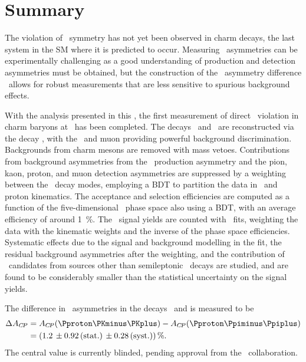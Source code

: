 \chapter{Summary}
\label{chap:cpv:summary}

The violation of \CP\ symmetry has not yet been observed in charm decays, the 
last system in the \ac{SM} where it is predicted to occur.
Measuring \CP\ asymmetries can be experimentally challenging as a good 
understanding of production and detection asymmetries must be obtained, but the 
construction of the \CP\ asymmetry difference \dACP\ allows for robust 
measurements that are less sensitive to spurious background effects.

With the analysis presented in this , the first 
measurement of direct \CP\ violation in charm baryons at \lhcb\ has been 
completed.
The decays \LcTopKK\ and \LcToppipi\ are reconstructed via the decay 
\LbToLcmuX, with the \PLambdab\ and muon providing powerful background 
discrimination.
Backgrounds from charm mesons are removed with mass vetoes.
Contributions from background asymmetries from the \PLambdab\ production 
asymmetry and the pion, kaon, proton, and muon detection asymmetries are 
suppressed by a weighting between the \PLambdac\ decay modes, employing a 
\acl{BDT} to partition the data in \PLambdac\ and proton kinematics.
The acceptance and selection efficiencies are computed as a function of the 
five-dimensional \PLambdac\ phase space also using a \ac{BDT}, with an average 
efficiency of around \SI{1}{\percent}.
The \PLambdac\ signal yields are counted with \chisq\ fits, weighting the data 
with the kinematic weights and the inverse of the phase space efficiencies.
Systematic effects due to the signal and background modelling in the fit, the 
residual background asymmetries after the weighting, and the contribution of 
\PLambdac\ candidates from sources other than semileptonic \PLambdac\ decays 
are studied, and are found to be considerably smaller than the statistical 
uncertainty on the signal yields.

The difference in \CP\ asymmetries in the decays \LcTopKK\ and \LcToppipi is 
measured to be
\begin{align*}
  \dACP &= \ACP(\pKK) - \ACP(\ppipi) \\
        &= \SIerrs{\deltaACPval}{\deltaACPunc}{0.28}{\percent}.
\end{align*}
The central value is currently blinded, pending approval from the \lhcb\ 
collaboration.
